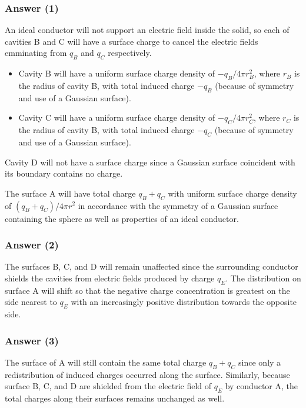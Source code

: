 \subsubsection{Answer (1)}
An ideal conductor will not support an electric field inside the solid, so each
of cavities B and C will have a surface charge to cancel the electric fields
emminating from $q_B$ and $q_C$ respectively.
\begin{itemize}
	\item
		Cavity B will have a uniform surface charge density of $-q_B/4{\pi} r^2_B$,
		where $r_B$ is the radius of cavity B, with total induced charge $-q_B$
		(because of symmetry and use of a Gaussian surface).
	\item
		Cavity C will have a uniform surface charge density of $-q_C/4{\pi} r^2_C$,
		where $r_C$ is the radius of cavity B, with total induced charge $-q_C$
		(because of symmetry and use of a Gaussian surface).
\end{itemize}
Cavity D will not have a surface charge since a Gaussian surface coincident with
its boundary contains no charge.

The surface A will have total charge $q_B + q_C$ with uniform surface charge
density of $(q_B + q_C) / 4{\pi} r^2$ in accordance with the symmetry of a Gaussian
surface containing the sphere as well as properties of an ideal conductor.

\subsubsection{Answer (2)}
The surfaces B, C, and D will remain unaffected since the surrounding conductor
shields the cavities from electric fields produced by charge $q_E$. The
distribution on surface A will shift so that the negative charge concentration
is greatest on the side nearest to $q_E$ with an increasingly positive
distribution towards the opposite side.

\subsubsection{Answer (3)}
The surface of A will still contain the same total charge $q_B + q_C$ since only
a redistribution of induced charges occurred along the surface. Similarly,
because surface B, C, and D are shielded from the electric field of $q_E$ by
conductor A, the total charges along their surfaces remains unchanged as well.

